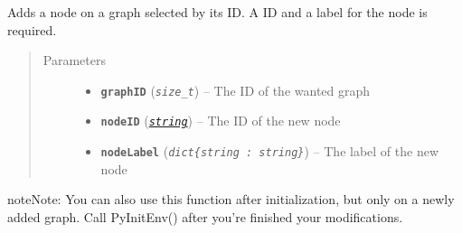 \documentclass[letterpaper,10pt,english]{sphinxmanual}
\begin{document}
\begin{fulllineitems}
\label{doc:PythonGedLib.PyAddNode}
Adds a node on a graph selected by its ID. A ID and a label for the node is required.
\begin{quote}\begin{description}
\item[{Parameters}] \leavevmode\begin{itemize}
\item {} 
\textbf{\texttt{graphID}} (\emph{\texttt{size\_t}}) -- The ID of the wanted graph

\item {} 
\textbf{\texttt{nodeID}} (\href{https://docs.python.org/3/library/string.html\#module-string}{\emph{\texttt{string}}}) -- The ID of the new node

\item {} 
\textbf{\texttt{nodeLabel}} (\emph{\texttt{dict\{string : string\}}}) -- The label of the new node

\end{itemize}

\end{description}\end{quote}

\begin{notice}{note}{Note:}
You can also use this function after initialization, but only on a newly added graph. Call PyInitEnv() after you're finished your modifications.
\end{notice}

\end{fulllineitems}

\end{document}
